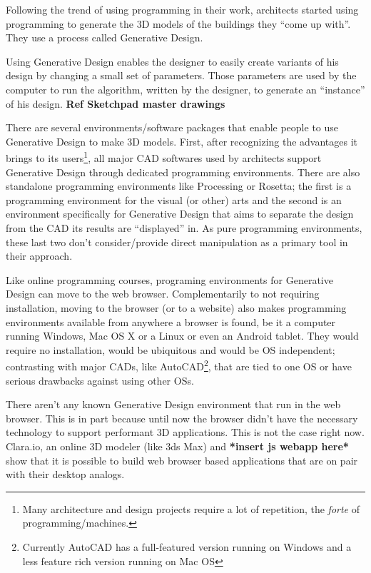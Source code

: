 \documentclass{./llncs2e/llncs}
\begin{document}
	Following the trend of using programming in their work, architects started using programming to generate the 3D models of the buildings they ``come up with''. They use a process called Generative Design\cite{terzidis2003expressive}\cite{Maeda:2001:DN:559503}.

	Using Generative Design enables the designer to easily create variants of his design by changing a small set of parameters. Those parameters are used by the computer to run the algorithm, written by the designer, to generate an ``instance'' of his design. \cite{Santos20144} \textbf{Ref Sketchpad master drawings}

	There are several environments/software packages that enable people to use Generative Design to make 3D models. First, after recognizing the advantages it brings to its users\footnote{Many architecture and design projects require a lot of repetition, the \emph{forte} of programming/machines.}, all major CAD softwares used by architects support Generative Design through dedicated programming environments. There are also standalone programming environments like Processing\cite{reas2007processing} or Rosetta\cite{de2012modern}; the first is a programming environment for the visual (or other) arts and the second is an environment specifically for Generative Design that aims to separate the design from the CAD its results are ``displayed'' in. As pure programming environments, these last two don't consider/provide direct manipulation as a primary tool in their approach.

	Like online programming courses, programing environments for Generative Design can move to the web browser. Complementarily to not requiring installation, moving to the browser (or to a website) also makes programming environments available from anywhere a browser is found, be it a computer running Windows, Mac OS X or a Linux or even an Android tablet. They would require no installation, would be ubiquitous and would be OS independent; contrasting with major CADs, like AutoCAD\footnote{Currently AutoCAD has a full-featured version running on Windows and a less feature rich version running on Mac OS}, that are tied to one OS or have serious drawbacks against using other OSs.

	There aren't any known Generative Design environment that run in the web browser. This is in part because until now the browser didn't have the necessary technology to support performant 3D applications. This is not the case right now. Clara.io\cite{Houston:2013:CFC:2503673.2503681}, an online 3D modeler (like 3ds Max) and \textbf{*insert js webapp here*} show that it is possible to build web browser based applications that are on pair with their desktop analogs.
\end{document}
